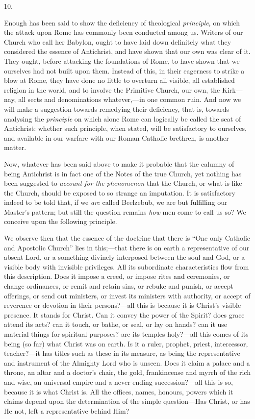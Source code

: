 10.

Enough has been said to show the deficiency of theological \emph{principle},
on which the attack upon Rome has commonly been conducted among us.
Writers of our Church who call her Babylon, ought to have laid down
definitely what they considered the essence of Antichrist, and have
shown that our own was clear of it. They ought, before attacking the
foundations of Rome, to have shown that we ourselves had not built
upon them. Instead of this, in their eagerness to strike a blow at
Rome, they have done no little to overturn all visible, all
established religion in the world, and to involve the Primitive
Church, our own, the Kirk—nay, all sects and denominations
whatever,—in one common ruin. And now we will make a suggestion
towards remedying their deficiency, that is, towards analysing the \emph{principle}
on which alone Rome can logically be called the seat of Antichrist:
whether such principle, when stated, will be satisfactory to
ourselves, and available in our warfare with our Roman Catholic
brethren, is another matter.

Now, whatever has been said above to make it probable that the
calumny of being Antichrist is in fact one of the Notes of the true
Church, yet nothing has been suggested to \emph{account for the
phenomenon} that the Church, or what is like the Church, should be
exposed to so strange an imputation. It is satisfactory indeed to be
told that, if we \emph{are} called Beelzebub, we are but fulfilling
our Master's pattern; but still the question remains \emph{how} men
come to call us so? We conceive upon the following principle.

We observe then that the essence of the doctrine that there is
``One only Catholic and Apostolic Church'' lies in this;—that
there is on earth a representative of our absent Lord, or a something
divinely interposed between the soul and God, or a visible body with
invisible privileges. All its subordinate characteristics flow from
this description. Does it impose a creed, or impose rites and
ceremonies, or change ordinances, or remit and retain sins, or rebuke
and punish, or accept offerings, or send out ministers, or invest its
ministers with authority, or accept of reverence or devotion in their
persons?—all this is because it is Christ's visible presence. It
stands for Christ. Can it convey the power of the Spirit? does grace
attend its acts? can it touch, or bathe, or seal, or lay on hands? can
it use material things for spiritual purposes? are its temples holy?—all
this comes of its being (so far) what Christ was on earth. Is it
a ruler, prophet, priest, intercessor, teacher?—it has titles such
as these in its measure, as being the representative and instrument of
the Almighty Lord who is unseen. Does it claim a palace and a throne,
an altar and a doctor's chair, the gold, frankincense and myrrh of the
rich and wise, an universal empire and a never-ending succession?—all
this is so, because it is what Christ is. All the offices, names,
honours, powers which it claims depend upon the determination of the
simple question—Has Christ, or has He not, left a representative
behind Him?

